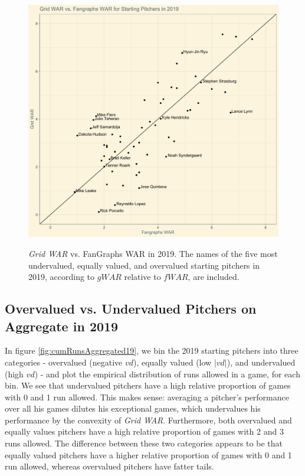 \documentclass[12pt]{article}
\begin{document}
\begin{figure}[t!]
\centering
\caption{\textit{Grid WAR} vs. FanGraphs WAR in 2019. The names of the five most undervalued, equally valued, and overvalued starting pitchers in 2019, according to $gWAR$ relative to $fWAR$, are included.} 
\includegraphics[width=15cm]{../writeup_plots/plot_gwar_vs_fwar_2019.png}
\label{fig:gwarVfwar19}
\end{figure}

\subsection{Overvalued vs. Undervalued Pitchers on Aggregate in 2019}

In figure \ref{fig:cumRunsAggregated19}, we bin the 2019 starting pitchers into three categories - overvalued (negative $vd$), equally valued (low $|vd|$), and undervalued (high $vd$) - and plot the empirical distribution of runs allowed in a game, for each bin. We see that undervalued pitchers have a high relative proportion of games with 0 and 1 run allowed. This makes sense: averaging a pitcher's performance over all his games dilutes his exceptional games, which undervalues his performance by the convexity of \textit{Grid WAR}. Furthermore, both overvalued and equally values pitchers have a high relative proportion of games with 2 and 3 runs allowed. The difference between these two categories appears to be that equally valued pitchers have a higher relative proportion of games with 0 and 1 run allowed, whereas overvalued pitchers have fatter tails.
\end{document}
